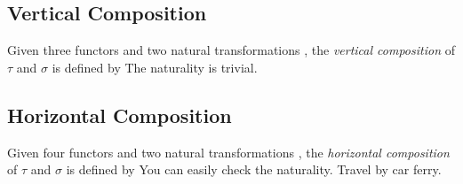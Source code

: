 \subsection{Vertical Composition}

Given three functors
and two natural transformations
, the \textit{vertical composition} of $\tau$ and $\sigma$ is defined by
The naturality is trivial.

\subsection{Horizontal Composition}

Given four functors
and two natural transformations
, the \textit{horizontal composition} of $\tau$ and $\sigma$ is defined by
You can easily check the naturality. Travel by car ferry.


